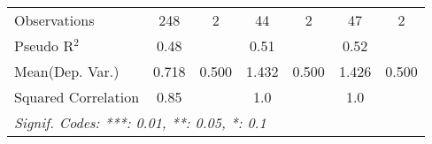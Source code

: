 \begin{tabular}{lcccccc}
   Observations                                               & 248           & 2    & 44           & 2    & 47           & 2\\  
   Pseudo R$^2$                                               & 0.48          &      & 0.51         &      & 0.52         & \\  
Mean(Dep. Var.) & 0.718 & 0.500 & 1.432 & 0.500 & 1.426 & 0.500 \\
   Squared Correlation                                        & 0.85          &      & 1.0          &      & 1.0          & \\  
   \midrule \midrule
   \multicolumn{7}{l}{\emph{Signif. Codes: ***: 0.01, **: 0.05, *: 0.1}}\\
\end{tabular}
\par\endgroup
